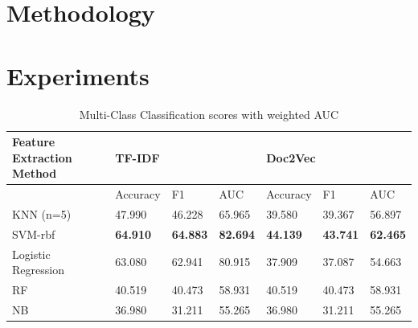 \documentclass{article}
\begin{document}
\section{Methodology}

\section{Experiments}

\begin{table}[h]
  \begin{tabular}{lllllll}
  \hline
  Feature Extraction Method & \multicolumn{3}{l}{TF-IDF}                          & \multicolumn{3}{l}{Doc2Vec}                         \\ \hline
                            & Accuracy        & F1              & AUC             & Accuracy        & F1              & AUC             \\ \hline
  KNN (n=5)                 & 47.990          & 46.228          & 65.965          & 39.580          & 39.367          & 56.897          \\
  SVM-rbf                   & \textbf{64.910} & \textbf{64.883} & \textbf{82.694} & \textbf{44.139} & \textbf{43.741} & \textbf{62.465} \\
  Logistic Regression       & 63.080          & 62.941          & 80.915          & 37.909          & 37.087          & 54.663          \\
  RF                        & 40.519          & 40.473          & 58.931          & 40.519          & 40.473          & 58.931          \\
  NB                        & 36.980          & 31.211          & 55.265          & 36.980          & 31.211          & 55.265          \\ \hline
  \end{tabular}
  \caption{Multi-Class Classification scores with weighted AUC}
\end{table}
\end{document}
